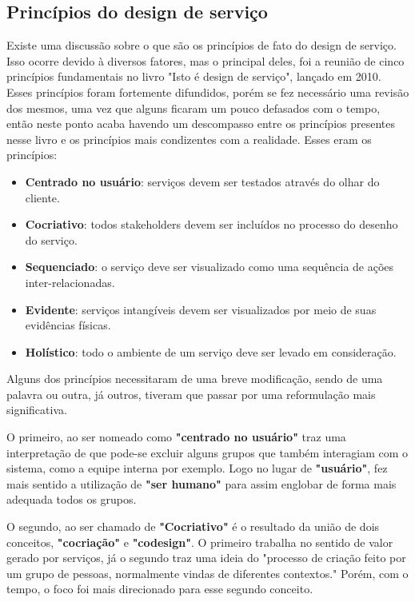 \subsection{Princípios do design de serviço}

Existe uma discussão sobre o que são os princípios de fato do design de serviço. Isso ocorre devido à diversos fatores, mas o principal deles, foi a reunião de cinco princípios fundamentais no livro "Isto é design de serviço", lançado em 2010. Esses princípios foram fortemente difundidos, porém se fez necessário uma revisão dos mesmos, uma vez que alguns ficaram um pouco defasados com o tempo, então neste ponto acaba havendo um descompasso entre os princípios presentes nesse livro e os princípios mais condizentes com a realidade. Esses eram os princípios:

\begin{itemize}
	\item \textbf{Centrado no usuário}: serviços devem ser testados através do olhar do cliente.
	\item \textbf{Cocriativo}: todos stakeholders devem ser incluídos no processo do desenho do serviço.
	\item \textbf{Sequenciado}: o serviço deve ser visualizado como uma sequência de ações inter-relacionadas.
	\item \textbf{Evidente}: serviços intangíveis devem ser visualizados por meio de suas evidências físicas.
	\item \textbf{Holístico}: todo o ambiente de um serviço deve ser levado em consideração.
\end{itemize}
	
Alguns dos princípios necessitaram de uma breve modificação, sendo de uma palavra ou outra, já outros, tiveram que passar por uma reformulação mais significativa.

O primeiro, ao ser nomeado como \textbf{"centrado no usuário"} traz uma interpretação de que pode-se excluir alguns grupos que também interagiam com o sistema, como a equipe interna por exemplo. Logo no lugar de \textbf{"usuário"}, fez mais sentido a utilização de \textbf{"ser humano"} para assim englobar de forma mais adequada todos os grupos.

O segundo, ao ser chamado de \textbf{"Cocriativo"} é o resultado da união de dois conceitos, \textbf{"cocriação"} e \textbf{"codesign"}. O primeiro trabalha no sentido de valor gerado por serviços, já o segundo traz uma ideia do "processo de criação feito por um grupo de pessoas, normalmente vindas de diferentes contextos."\cite{Stickdorn2019} Porém, com o tempo, o foco foi mais direcionado para esse segundo conceito.

